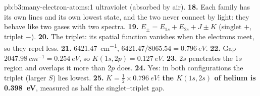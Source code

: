 \begin{solution}{pb:b3:many-electron-atoms:1}
ultraviolet (absorbed by air).
\textbf{18.} Each family has its own lines and its own lowest state, and the
two never connect by light: they behave like two gases with two spectra.
\textbf{19.} $E_\pm = E_{1s} + E_{2s} + J \pm K$ (singlet $+$, triplet $-$).
\textbf{20.} The triplet: its spatial function vanishes when the electrons meet,
so they repel less.
\textbf{21.} \qty{6421.47}{cm^{-1}}, $6421.47/8065.54 = \qty{0.796}{eV}$.
\textbf{22.} Gap $\qty{2047.98}{cm^{-1}} = \qty{0.254}{eV}$, so $K(1s,2p) =
\qty{0.127}{eV}$.
\textbf{23.} $2s$ penetrates the $1s$ region and overlaps it more than $2p$
does.
\textbf{24.} Yes: in both configurations the triplet (larger $S$) lies lowest.
\textbf{25.} $K = \frac12 \times \qty{0.796}{eV}$: \textbf{the  $K(1s,2s)$ of helium is \qty{0.398}{eV}}, measured as half the
singlet--triplet gap.
\end{solution}
